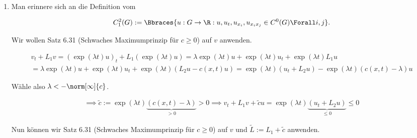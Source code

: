 
\begin{solution}

\phantom{}

\begin{enumerate}[label = (\roman*)]

  \item Man erinnere sich an die Definition vom
  
  \begin{align*}
    C_1^2(G)
    :=
    \Bbraces
    {
      u:
      G \to \R:
      u, u_t, u_{x_i}, u_{x_i x_j} \in C^0(G)
      \Forall i, j
    }.
  \end{align*}

  Wir wollen Satz 6.31 (Schwaches Maximumprinzip für $c \geq 0$) auf $v$ anwenden.


  \begin{multline*}
    v_t + L_1 v
    =
    (\exp(\lambda t) u)_t + L_1 (\exp(\lambda t) u)
    =
    \lambda \exp(\lambda t) u + \exp(\lambda t) u_t
    +
    \exp(\lambda t) L_1 u \\
    =
    \lambda \exp(\lambda t) u + \exp(\lambda t) u_t
    +
    \exp(\lambda t) (L_2 u - c(x, t) u)
    =
    \exp(\lambda t) (u_t +  L_2 u)
    -
    \exp(\lambda t) (c(x, t) - \lambda) u
  \end{multline*}

  Wähle also $\lambda < -\norm[\infty]{c}$.

  \begin{align*}
    \implies
    \tilde{c}
    :=
    \exp(\lambda t)
    \underbrace
    {
      (c(x, t) - \lambda)
    }_{
      > 0
    }
    >
    0
    \implies
    v_t + L_1 v + \tilde{c} u
    =
    \exp(\lambda t)
    \underbrace
    {
      (u_t +  L_2 u)
    }_{
      \leq 0
    }
    \leq
    0
  \end{align*}

  Nun können wir Satz 6.31 (Schwaches Maximumprinzip für $c \geq 0$) auf $v$ und $\tilde{L} := L_1 + \tilde{c}$ anwenden.


\end{enumerate}
\end{solution}
